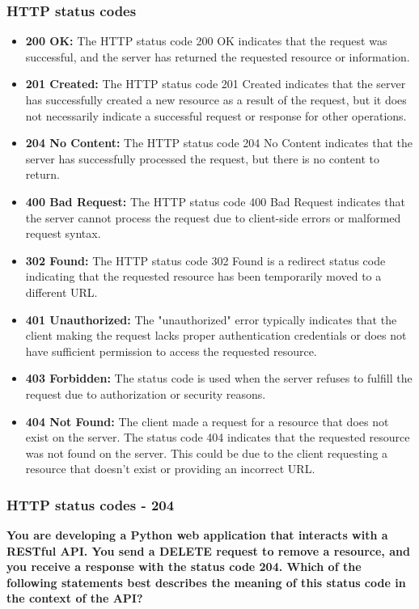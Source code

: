 \subsubsection{HTTP status codes}
\begin{itemize}
\item \textbf{200 OK:} The HTTP status code 200 OK indicates that the request was successful, and the server has returned the requested resource or information.

\item \textbf{201 Created:} The HTTP status code 201 Created indicates that the server has successfully created a new resource as a result of the request, but it does not necessarily indicate a successful request or response for other operations.

\item \textbf{204 No Content:} The HTTP status code 204 No Content indicates that the server has successfully processed the request, but there is no content to return.

\item \textbf{400 Bad Request:} The HTTP status code 400 Bad Request indicates that the server cannot process the request due to client-side errors or malformed request syntax.

\item \textbf{302 Found:} The HTTP status code 302 Found is a redirect status code indicating that the requested resource has been temporarily moved to a different URL.

\item \textbf{401 Unauthorized:} The "unauthorized" error typically indicates that the client making the request lacks proper authentication credentials or does not have sufficient permission to access the requested resource.

\item \textbf{403 Forbidden:} The status code is used when the server refuses to fulfill the request due to authorization or security reasons.

\item \textbf{404 Not Found:} The client made a request for a resource that does not exist on the server. The status code 404 indicates that the requested resource was not found on the server. This could be due to the client requesting a resource that doesn't exist or providing an incorrect URL.
\end{itemize}

\subsubsection{HTTP status codes - 204}
\textbf{You are developing a Python web application that interacts with a RESTful API. You send a DELETE request to remove a resource, and you receive a response with the status code 204. Which of the following statements best describes the meaning of this status code in the context of the API?}\\

